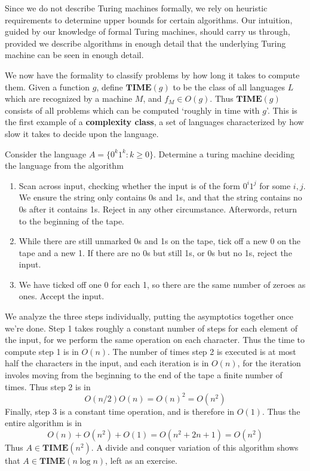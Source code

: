 Since we do not describe Turing machines formally, we rely on heuristic requirements to determine upper bounds for certain algorithms. Our intuition, guided by our knowledge of formal Turing machines, should carry us through, provided we describe algorithms in enough detail that the underlying Turing machine can be seen in enough detail.

We now have the formality to classify problems by how long it takes to compute them. Given a function $g$, define $\mathbf{TIME}(g)$ to be the class of all languages $L$ which are recognized by a machine $M$, and $f_M \in O(g)$. Thus $\mathbf{TIME}(g)$ consists of all problems which can be computed `roughly in time with $g$'. This is the first example of a {\bf complexity class}, a set of languages characterized by how slow it takes to decide upon the language.

\begin{example}
    Consider the language $A = \{ 0^k1^k : k \geq 0 \}$. Determine a turing machine deciding the language from the algorithm
    \begin{enumerate}
        \item Scan across input, checking whether the input is of the form $0^i 1^j$ for some $i,j$. We ensure the string only contains 0s and 1s, and that the string contains no 0s after it contains 1s. Reject in any other circumstance. Afterwords, return to the beginning of the tape.
        \item While there are still unmarked 0s and 1s on the tape, tick off a new 0 on the tape and a new 1. If there are no 0s but still 1s, or 0s but no 1s, reject the input.
        \item We have ticked off one 0 for each 1, so there are the same number of zeroes as ones. Accept the input.
    \end{enumerate}
    We analyze the three steps individually, putting the asymptotics together once we're done. Step 1 takes roughly a constant number of steps for each element of the input, for we perform the same operation on each character. Thus the time to compute step 1 is in $O(n)$. The number of times step 2 is executed is at most half the characters in the input, and each iteration is in $O(n)$, for the iteration involes moving from the beginning to the end of the tape a finite number of times. Thus step 2 is in
    \[ O(n/2)O(n) = O(n)^2 = O(n^2) \]
    Finally, step 3 is a constant time operation, and is therefore in $O(1)$. Thus the entire algorithm is in
    \[ O(n) + O(n^2) + O(1) = O(n^2 + 2n + 1) = O(n^2) \]
    Thus $A \in \mathbf{TIME}(n^2)$. A divide and conquer variation of this algorithm shows that $A \in \mathbf{TIME}(n \log n)$, left as an exercise.
\end{example}

